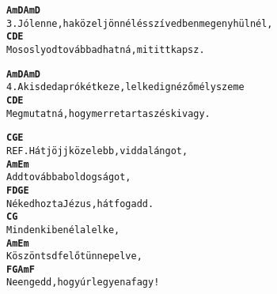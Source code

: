 \cleardoublepage
{}
\kottastart
{}
\kottaend
\begin{minipage}{\textwidth}
\begin{alltt}
\textbf{              Am          D            Am           D}
3. Jó lenne, ha közel jönnél és szívedben megenyhülnél,
\textbf{              C           D           E}
   Mososlyod tovább adhatná, mit itt kapsz.
\end{alltt}
\vspace{0.0cm}
\versszakspacing
\end{minipage}
\begin{minipage}{\textwidth}
\begin{alltt}
\textbf{            Am          D            Am           D}
4. A kisded apró két keze, lelkedig néző mély szeme
\textbf{            C              D             E}
   Megmutatná, hogy merre tartasz és ki vagy.
\end{alltt}
\vspace{0.0cm}
\versszakspacing
\end{minipage}
\begin{minipage}{\textwidth}
\begin{alltt}
\textbf{          C              G      E}
REF. Hát jöjj közelebb, vidd a lángot,
\textbf{     Am             Em}
     Add tovább a boldogságot,
\textbf{     F            D            G    E}
     Néked hozta Jézus, hát fogadd.
\textbf{     C           G}
     Mindenkiben él a lelke,
\textbf{     Am                 Em}
     Köszöntsd fel őt ünnepelve,
\textbf{     F               G            Am     F}
     Ne engedd, hogy úr legyen a fagy!
\end{alltt}
\vspace{0.0cm}
\versszakspacing
\end{minipage}
~\vspace{1.0cm}
\newline
